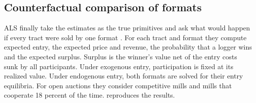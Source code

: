 \subsection{Counterfactual comparison of formats}\label{sec:15-als-welfare}

ALS finally take the estimates as the true primitives and ask what would happen if every tract were sold by
one format \citep[Section V.C]{AtheyLevinSeira2011}. For each tract and format they compute expected entry,
the expected price and revenue, the probability that a logger wins and the expected surplus. Surplus is the
winner's value net of the entry costs sunk by all participants. Under exogenous entry, participation is
fixed at its realized value. Under endogenous entry, both formats are solved for their entry equilibria.
For open auctions they consider competitive mills and mills that cooperate 18 percent of the time.
 reproduces the results.

